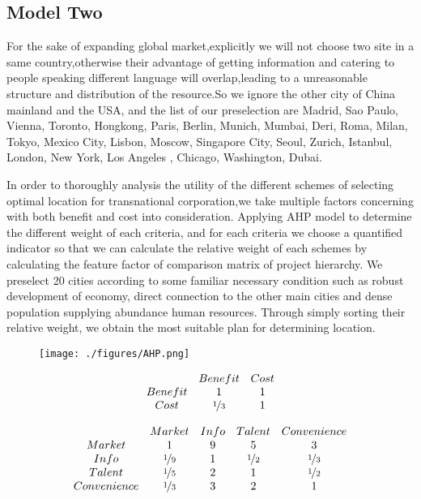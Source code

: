 \documentclass{mcmthesis}
\begin{document}
\subsection{Model Two}
For the sake of expanding global market,explicitly we will not choose two site in a same country,otherwise their advantage of getting information and catering to people speaking different language will overlap,leading to a unreasonable structure and distribution of the resource.So we ignore the other city of China mainland and the USA, and the list of our preselection are Madrid, Sao Paulo, Vienna, Toronto, Hongkong, Paris, Berlin, Munich, Mumbai, Deri, Roma, Milan, Tokyo, Mexico City, Lisbon, Moscow, Singapore City, Seoul, Zurich, Istanbul, London, New York, Los Angeles , Chicago, Washington, Dubai.

In order to thoroughly analysis the utility of the different schemes of selecting optimal location for transnational corporation,we take multiple factors concerning with both benefit and cost into consideration. Applying AHP model to determine the different weight of each criteria, and for each criteria we choose a quantified indicator so that we can calculate the relative weight of each schemes by calculating the feature factor of comparison matrix of project hierarchy. We preselect 20 cities according to some familiar necessary condition such as robust development of economy, direct connection to the other main cities and dense population supplying abundance human resources. Through simply sorting their relative weight, we obtain the most suitable plan for determining location.

\begin{figure}[h!]
    \texttt{[image: ./figures/AHP.png]}
\end{figure}

\begin{align*}
\begin{matrix}
 & Benefit & Cost\\
Benefit & 1 & 1\\
Cost & $\nicefrac{1}{3}$ & 1
\end{matrix}
\end{align*}

\begin{align*}
\begin{matrix}
    &Market&Info&Talent&Convenience\\
    Market&1&9&5&3\\
    Info&\nicefrac{1}{9}&1&\nicefrac{1}{2}&\nicefrac{1}{3}\\
    Talent&\nicefrac{1}{5}&2&1&\nicefrac{1}{2}\\
    Convenience&\nicefrac{1}{3}&3&2&1
\end{matrix}
\end{align*}
\end{document}
